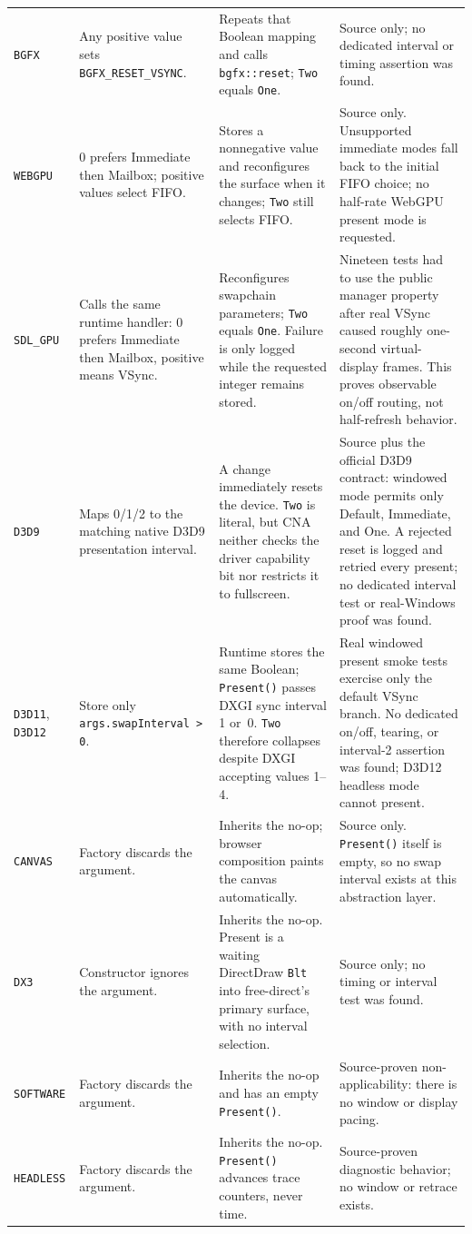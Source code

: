 \begin{longtable}{@{}p{}p{}p{}p{}@{}}
\texttt{BGFX}
  & Any positive value sets \texttt{BGFX\_RESET\_VSYNC}.
  & Repeats that Boolean mapping and calls \texttt{bgfx::reset}; \texttt{Two} equals
    \texttt{One}.
  & Source only; no dedicated interval or timing assertion was found. \\
\texttt{WEBGPU}
  & 0 prefers Immediate then Mailbox; positive values select FIFO.
  & Stores a nonnegative value and reconfigures the surface when it changes; \texttt{Two}
    still selects FIFO.
  & Source only. Unsupported immediate modes fall back to the initial FIFO choice; no
    half-rate WebGPU present mode is requested. \\
\texttt{SDL\_GPU}
  & Calls the same runtime handler: 0 prefers Immediate then Mailbox, positive means VSync.
  & Reconfigures swapchain parameters; \texttt{Two} equals \texttt{One}. Failure is only
    logged while the requested integer remains stored.
  & Nineteen tests had to use the public manager property after real VSync caused roughly
    one-second virtual-display frames. This proves observable on/off routing, not
    half-refresh behavior. \\
\texttt{D3D9}
  & Maps 0/1/2 to the matching native D3D9 presentation interval.
  & A change immediately resets the device. \texttt{Two} is literal, but CNA neither checks
    the driver capability bit nor restricts it to fullscreen.
  & Source plus the official D3D9 contract: windowed mode permits only Default, Immediate,
    and One. A rejected reset is logged and retried every present; no dedicated interval
    test or real-Windows proof was found. \\
\texttt{D3D11}, \texttt{D3D12}
  & Store only \texttt{args.swapInterval > 0}.
  & Runtime stores the same Boolean; \texttt{Present()} passes DXGI sync interval 1 or~0.
    \texttt{Two} therefore collapses despite DXGI accepting values 1--4.
  & Real windowed present smoke tests exercise only the default VSync branch. No dedicated
    on/off, tearing, or interval-2 assertion was found; D3D12 headless mode cannot present. \\
\texttt{CANVAS}
  & Factory discards the argument.
  & Inherits the no-op; browser composition paints the canvas automatically.
  & Source only. \texttt{Present()} itself is empty, so no swap interval exists at this
    abstraction layer. \\
\texttt{DX3}
  & Constructor ignores the argument.
  & Inherits the no-op. Present is a waiting DirectDraw \texttt{Blt} into free-direct's
    primary surface, with no interval selection.
  & Source only; no timing or interval test was found. \\
\texttt{SOFTWARE}
  & Factory discards the argument.
  & Inherits the no-op and has an empty \texttt{Present()}.
  & Source-proven non-applicability: there is no window or display pacing. \\
\texttt{HEADLESS}
  & Factory discards the argument.
  & Inherits the no-op. \texttt{Present()} advances trace counters, never time.
  & Source-proven diagnostic behavior; no window or retrace exists. \\
\bottomrule
\end{longtable}
\endgroup

